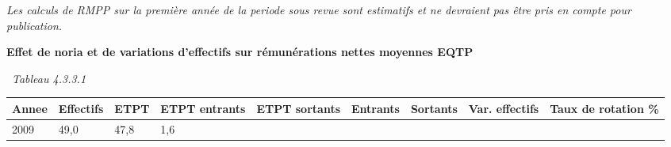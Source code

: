 \emph{Les calculs de RMPP sur la première année de la periode sous revue
sont estimatifs et ne devraient pas être pris en compte pour
publication.}

\textbf{Effet de noria et de variations d'effectifs sur rémunérations
nettes moyennes EQTP}

~\emph{Tableau 4.3.3.1}

\begin{longtable}[]{@{}lllllllll@{}}
\toprule
\begin{minipage}[b]{0.05\columnwidth}\raggedright
Annee\strut
\end{minipage} & \begin{minipage}[b]{0.08\columnwidth}\raggedright
Effectifs\strut
\end{minipage} & \begin{minipage}[b]{0.04\columnwidth}\raggedright
ETPT\strut
\end{minipage} & \begin{minipage}[b]{0.10\columnwidth}\raggedright
ETPT entrants\strut
\end{minipage} & \begin{minipage}[b]{0.10\columnwidth}\raggedright
ETPT sortants\strut
\end{minipage} & \begin{minipage}[b]{0.07\columnwidth}\raggedright
Entrants\strut
\end{minipage} & \begin{minipage}[b]{0.07\columnwidth}\raggedright
Sortants\strut
\end{minipage} & \begin{minipage}[b]{0.11\columnwidth}\raggedright
Var. effectifs\strut
\end{minipage} & \begin{minipage}[b]{0.14\columnwidth}\raggedright
Taux de rotation \%\strut
\end{minipage}\tabularnewline
\midrule
\endhead
\begin{minipage}[t]{0.05\columnwidth}\raggedright
2009\strut
\end{minipage} & \begin{minipage}[t]{0.08\columnwidth}\raggedright
49,0\strut
\end{minipage} & \begin{minipage}[t]{0.04\columnwidth}\raggedright
47,8\strut
\end{minipage} & \begin{minipage}[t]{0.10\columnwidth}\raggedright
1,6\strut
\end{minipage} & \begin{minipage}[t]{0.10\columnwidth}\raggedright

\end{minipage}
\end{longtable}
